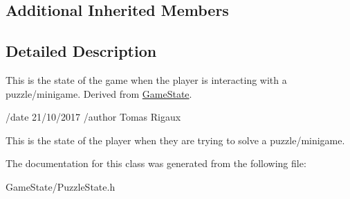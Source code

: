 \subsection*{Additional Inherited Members}


\subsection{Detailed Description}
This is the state of the game when the player is interacting with a puzzle/minigame. Derived from \hyperlink{classGameState}{Game\-State}. 

/date 21/10/2017 /author Tomas Rigaux

This is the state of the player when they are trying to solve a puzzle/minigame. 

The documentation for this class was generated from the following file\-:\begin{DoxyCompactItemize}
\item 
Game\-State/Puzzle\-State.\-h\end{DoxyCompactItemize}
